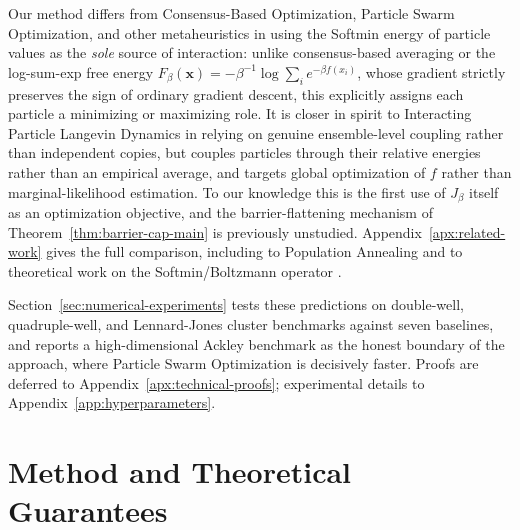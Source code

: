\documentclass{opt2026} %
\newcommand{\xx}{\mathbf{x}}
\begin{document}
Our method differs from Consensus-Based Optimization, Particle Swarm Optimization, and other metaheuristics \citep{CarrilloChoiTotzeckTse2018,fornasier2024consensus,pinnau2017consensus,carrillo2021consensus,kennedy1995particle,noel2012new,Goldberg1989,DorigoStutzle2004} in using the Softmin energy of particle values as the \emph{sole} source of interaction: unlike consensus-based averaging or the log-sum-exp free energy $F_\beta(\xx)=-\beta^{-1}\log\sum_ie^{-\beta f(x_i)}$, whose gradient strictly preserves the sign of ordinary gradient descent, this explicitly assigns each particle a minimizing or maximizing role. It is closer in spirit to Interacting Particle Langevin Dynamics \citep{akyildiz2025interacting,encinar2025proximal} in relying on genuine ensemble-level coupling rather than independent copies, but couples particles through their relative energies rather than an empirical average, and targets global optimization of $f$ rather than marginal-likelihood estimation. To our knowledge this is the first use of $J_\beta$ itself as an optimization objective, and the barrier-flattening mechanism of Theorem~\ref{thm:barrier-cap-main} is previously unstudied. Appendix~\ref{apx:related-work} gives the full comparison, including to Population Annealing \citep{Wang_2015} and to theoretical work on the Softmin/Boltzmann operator \citep{bertsekas1999nonlinear,mei2020global,song2019revisiting}.

Section~\ref{sec:numerical-experiments} tests these predictions on double-well, quadruple-well, and Lennard-Jones cluster benchmarks against seven baselines, and reports a high-dimensional Ackley benchmark as the honest boundary of the approach, where Particle Swarm Optimization is decisively faster. Proofs are deferred to Appendix~\ref{apx:technical-proofs}; experimental details to Appendix~\ref{app:hyperparameters}.

\section{Method and Theoretical Guarantees}
\label{sec:method}
\end{document}
